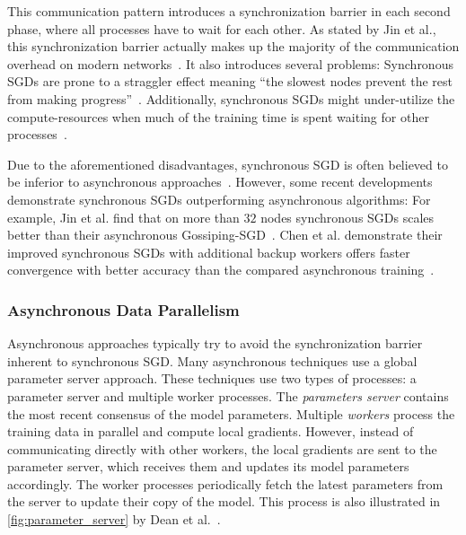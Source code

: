 \documentclass[conference]{IEEEtran}
\begin{document}
This communication pattern introduces a synchronization barrier in each second phase, where all processes have to wait for each other.
As stated by Jin et al., this synchronization barrier actually makes up the majority of the communication overhead on modern networks~\cite{jin2016-How-to-scale}.
It also introduces several problems:
Synchronous SGDs are prone to a straggler effect meaning ``the slowest nodes prevent the rest from making progress''~\cite{jin2016-How-to-scale}.
Additionally, synchronous SGDs might under-utilize the compute-resources when much of the training time is spent waiting for other processes~\cite{jin2016-How-to-scale}.

Due to the aforementioned disadvantages, synchronous SGD is often believed to be inferior to asynchronous approaches~\cite{chen2016-Revisiting-distributed-synchronous-SGD}.
However, some recent developments demonstrate synchronous SGDs outperforming asynchronous algorithms:
For example, Jin et al. find that on more than $32$ nodes synchronous SGDs scales better than their asynchronous Gossiping-SGD~\cite{jin2016-How-to-scale}.
Chen et al. demonstrate their improved synchronous SGDs with additional backup workers offers faster convergence with better accuracy than the compared asynchronous training~\cite{chen2016-Revisiting-distributed-synchronous-SGD}.


\subsubsection{Asynchronous Data Parallelism} %
\label{ssub:asynchronous_data_parallelism}

Asynchronous approaches typically try to avoid the synchronization barrier inherent to synchronous SGD.
%
Many asynchronous techniques use a global parameter server approach.
These techniques use two types of processes: a parameter server and multiple worker processes.
The \emph{parameters server} contains the most recent consensus of the model parameters.
Multiple \emph{workers} process the training data in parallel and compute local gradients.
However, instead of communicating directly with other workers, the local gradients are sent to the parameter server, which receives them and updates its model parameters accordingly.
The worker processes periodically fetch the latest parameters from the server to update their copy of the model.
This process is also illustrated in \autoref{fig:parameter_server} by Dean et al.~\cite{dean2012-Large-scale-distributed}.
\end{document}
